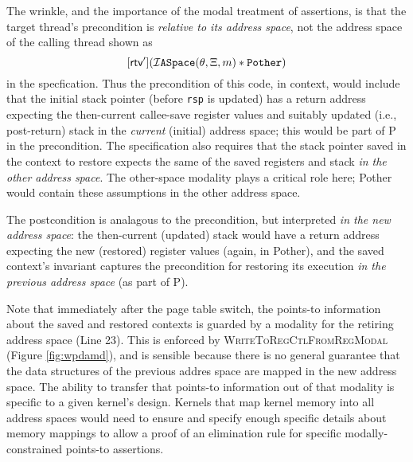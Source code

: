 The wrinkle, and the importance of the modal treatment of assertions, is that the target thread's precondition is \emph{relative to its address space}, 
not the address space of the calling thread shown as 
\[[\textsf{rtv}'](\mathcal{I}\texttt{ASpace}(\theta,\Xi,m) \ast \texttt{Pother})\]
in the specfication. 
Thus the precondition of this code,
in context, would include that the initial stack pointer (before \lstinline|rsp| is updated)
has a return address expecting the then-current callee-save register values and 
suitably updated (i.e., post-return) stack in the \emph{current} (initial) address space;
this would be part of \textsf{P} in the precondition.
The specification also requires that
the stack pointer saved in the context to restore expects the same of the saved registers and stack 
\emph{in the other address space}. 
The other-space modality plays a critical role here; \textsf{Pother} would contain these assumptions in the other
address space.


The postcondition is analagous to the precondition, but interpreted \emph{in the new address space}: the then-current (updated) stack would have a return address expecting the new (restored) register values (again, in \textsf{Pother}),
and the saved context's invariant captures the precondition for restoring its execution \emph{in the previous address space} (as part of \textsf{P}). 

Note that immediately after the page table switch, the points-to information about the saved and restored contexts is guarded by a modality for the retiring
address space \rtv (Line 23). This is enforced by \textsc{WriteToRegCtlFromRegModal} (Figure \ref{fig:wpdamd}), and is sensible because
there is no general guarantee that the data structures of the previous addres space are mapped in the new address space.
The ability to transfer that points-to information out of that modality is specific to a given kernel's design. 
Kernels that map kernel memory into all address spaces would need to ensure and specify enough specific details about memory mappings to allow a 
proof of an elimination rule for specific modally-constrained points-to assertions.

